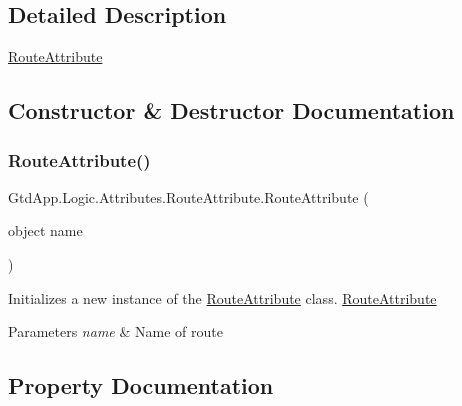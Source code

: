 \subsection{Detailed Description}
\mbox{\hyperlink{class_gtd_app_1_1_logic_1_1_attributes_1_1_route_attribute}{Route\+Attribute}} 



\subsection{Constructor \& Destructor Documentation}
\mbox{\label{class_gtd_app_1_1_logic_1_1_attributes_1_1_route_attribute_a89b404c2fc6f273056d51fd8621ed0d3}} 
\subsubsection{\texorpdfstring{Route\+Attribute()}{RouteAttribute()}}
{\footnotesize\ttfamily Gtd\+App.\+Logic.\+Attributes.\+Route\+Attribute.\+Route\+Attribute (\begin{DoxyParamCaption}\item[{object}]{name }\end{DoxyParamCaption})}



Initializes a new instance of the \mbox{\hyperlink{class_gtd_app_1_1_logic_1_1_attributes_1_1_route_attribute}{Route\+Attribute}} class. \mbox{\hyperlink{class_gtd_app_1_1_logic_1_1_attributes_1_1_route_attribute}{Route\+Attribute}} 


\begin{DoxyParams}{Parameters}
{\em name} & Name of route\\
\hline
\end{DoxyParams}


\subsection{Property Documentation}
\mbox{\label{class_gtd_app_1_1_logic_1_1_attributes_1_1_route_attribute_ae693a8f18d169efaccf1681eb09a9adb}} 
